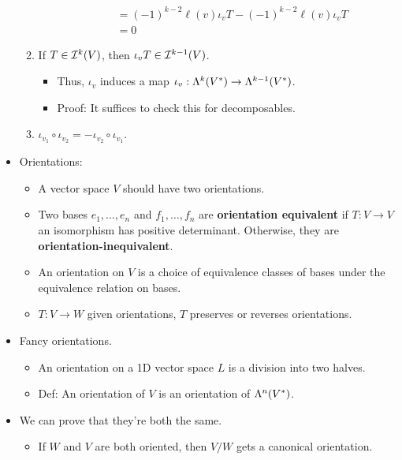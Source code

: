 \documentclass[../notes.tex]{subfiles}
\begin{document}
\begin{itemize}
\begin{enumerate}
\begin{itemize}
\begin{align*}
                &= (-1)^{k-2}\ell(v)\iota_vT-(-1)^{k-2}\ell(v)\iota_vT\\
                &= 0
            \end{align*}
        \end{itemize}
        \item If $T\in\ide[k]{V}$, then $\iota_vT\in\ide[k-1]{V}$.
        \begin{itemize}
            \item Thus, $\iota_v$ induces a map $\iota_v:\lam[k]{V^*}\to\lam[k-1]{V^*}$.
            \item Proof: It suffices to check this for decomposables.
        \end{itemize}
        \item $\iota_{v_1}\circ\iota_{v_2}=-\iota_{v_2}\circ\iota_{v_1}$.
    \end{enumerate}
    \item Orientations:
    \begin{itemize}
        \item A vector space $V$ should have two orientations.
        \item Two bases $e_1,\dots,e_n$ and $f_1,\dots,f_n$ are \textbf{orientation equivalent} if $T:V\to V$ an isomorphism has positive determinant. Otherwise, they are \textbf{orientation-inequivalent}.
        \item An orientation on $V$ is a choice of equivalence classes of bases under the equivalence relation on bases.
        \item $T:V\to W$ given orientations, $T$ preserves or reverses orientations.
    \end{itemize}
    \item Fancy orientations.
    \begin{itemize}
        \item An orientation on a 1D vector space $L$ is a division into two halves.
        \item Def: An orientation of $V$ is an orientation of $\lam[n]{V^*}$.
    \end{itemize}
    \item We can prove that they're both the same.
    \begin{itemize}
        \item If $W$ and $V$ are both oriented, then $V/W$ gets a canonical orientation.
    \end{itemize}
\end{itemize}
\end{document}

